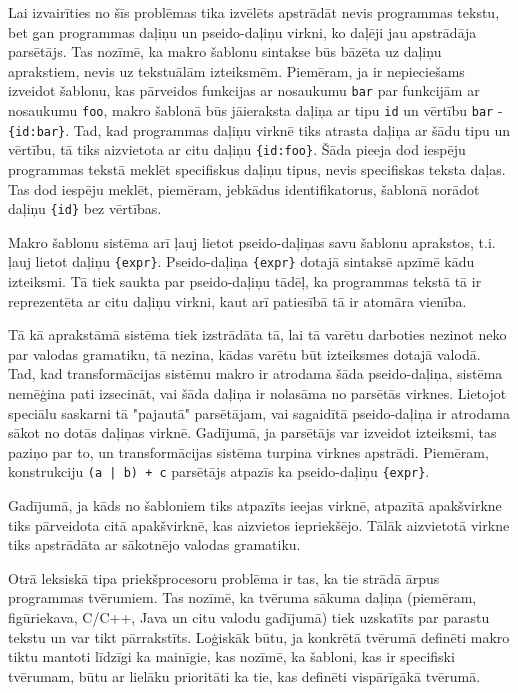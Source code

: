 Lai izvairīties no šīs problēmas tika izvēlēts apstrādāt nevis programmas tekstu, bet gan programmas daļiņu un pseido-daļiņu virkni, ko daļēji jau apstrādāja parsētājs. Tas nozīmē, ka makro šablonu sintakse būs bāzēta uz daļiņu aprakstiem, nevis uz tekstuālām izteiksmēm. Piemēram, ja ir nepieciešams izveidot šablonu, kas pārveidos funkcijas ar nosaukumu \verb|bar| par funkcijām ar nosaukumu \verb|foo|, makro šablonā būs jāieraksta daļiņa ar tipu \verb|id| un vērtību \verb|bar| - \verb|{id:bar}|. Tad, kad programmas daļiņu virknē tiks atrasta daļiņa ar šādu tipu un vērtību, tā tiks aizvietota ar citu daļiņu \verb|{id:foo}|. Šāda pieeja dod iespēju programmas tekstā meklēt specifiskus daļiņu tipus, nevis specifiskas teksta daļas. Tas dod iespēju meklēt, piemēram, jebkādus identifikatorus, šablonā norādot daļiņu \verb|{id}| bez vērtības. 

Makro šablonu sistēma arī ļauj lietot pseido-daļiņas savu šablonu aprakstos, t.i. ļauj lietot daļiņu \verb|{expr}|. Pseido-daļiņa \verb|{expr}| dotajā sintaksē apzīmē kādu izteiksmi. Tā tiek saukta par pseido-daļiņu tādēļ, ka programmas tekstā tā ir reprezentēta ar citu daļiņu virkni, kaut arī patiesībā tā ir atomāra vienība.

Tā kā aprakstāmā sistēma tiek izstrādāta tā, lai tā varētu darboties nezinot neko par valodas gramatiku, tā nezina, kādas varētu būt izteiksmes dotajā valodā. Tad, kad transformācijas sistēmu makro ir atrodama šāda pseido-daļiņa, sistēma nemēģina pati izsecināt, vai šāda daļiņa ir nolasāma no parsētās virknes. Lietojot speciālu saskarni tā "pajautā" parsētājam, vai sagaidītā pseido-daļiņa ir atrodama sākot no dotās daļiņas virknē. Gadījumā, ja parsētājs var izveidot izteiksmi, tas paziņo par to, un transformācijas sistēma turpina virknes apstrādi. Piemēram, konstrukciju \verb/(a | b) + c/ parsētājs atpazīs ka pseido-daļiņu \verb|{expr}|.

Gadījumā, ja kāds no šabloniem tiks atpazīts ieejas virknē, atpazītā apakšvirkne tiks pārveidota citā apakšvirknē, kas aizvietos iepriekšējo. Tālāk aizvietotā virkne tiks apstrādāta ar sākotnējo valodas gramatiku.

Otrā leksiskā tipa priekšprocesoru problēma ir tas, ka tie strādā ārpus programmas tvērumiem. Tas nozīmē, ka tvēruma sākuma daļiņa (piemēram, figūriekava, C/C++, Java un citu valodu gadījumā) tiek uzskatīts par parastu tekstu un var tikt pārrakstīts. Loģiskāk būtu, ja konkrētā tvērumā definēti makro tiktu mantoti līdzīgi ka mainīgie, kas nozīmē, ka šabloni, kas ir specifiski tvērumam, būtu ar lielāku prioritāti ka tie, kas definēti vispārīgākā tvērumā. 

